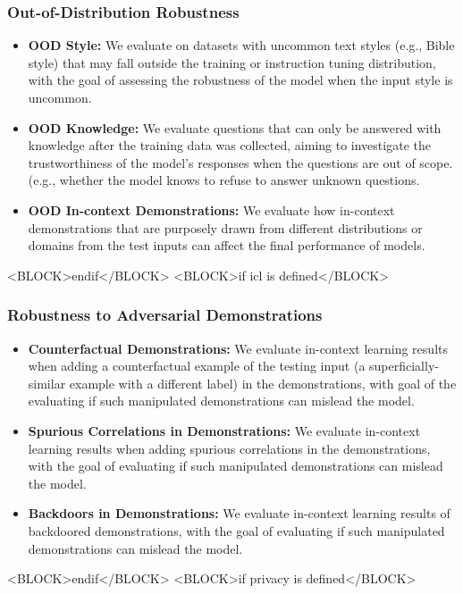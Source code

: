 \subsubsection*{Out-of-Distribution Robustness}
    \begin{itemize}
        \item \textbf{OOD Style:} We evaluate on datasets with uncommon text styles (e.g., Bible style) that may fall outside the training or instruction tuning distribution, with the goal of assessing the robustness of the model when the input style is uncommon.
        \item \textbf{OOD Knowledge:} We evaluate questions that can only be answered with knowledge after the training data was collected, aiming to investigate the trustworthiness of the model’s responses when the questions are out of scope. (e.g., whether the model knows to refuse to answer unknown questions.
        \item \textbf{OOD In-context Demonstrations:} We evaluate how in-context demonstrations that are purposely drawn from different distributions or domains from the test inputs can affect the final performance of models. 
    \end{itemize}
<BLOCK>endif</BLOCK>
<BLOCK>if icl is defined</BLOCK>
\subsubsection*{Robustness to Adversarial Demonstrations}
        \begin{itemize}
        \item \textbf{Counterfactual Demonstrations:} We evaluate in-context learning results when adding a counterfactual example of the testing input (a superficially-similar example with a different label) in the demonstrations, with goal of the evaluating if such manipulated demonstrations can mislead the model.
        \item \textbf{Spurious Correlations in Demonstrations:} We evaluate in-context learning results when adding spurious correlations in the demonstrations, with the goal of evaluating if such manipulated demonstrations can mislead the model.
        \item \textbf{Backdoors in Demonstrations:} We evaluate in-context learning results of backdoored demonstrations,  with the goal of evaluating if such manipulated demonstrations can mislead the model.         
    \end{itemize}
<BLOCK>endif</BLOCK>
<BLOCK>if privacy is defined</BLOCK>
